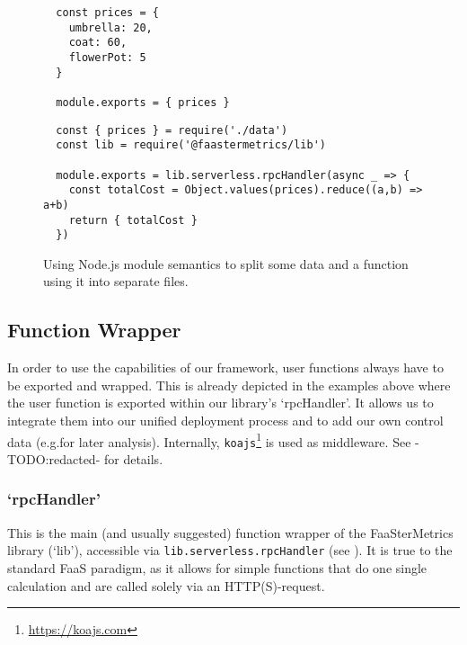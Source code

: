 \documentclass[../main.tex]{subfiles}
\begin{document}
\begin{figure}
\begin{tcolorbox}[left=3mm, right=3mm, top=3mm]
  \begin{tcolorbox}[enhanced, title={\texttt{[\ldots]/exampleFunction/data.js}}, attach boxed title to bottom left, boxed title style={sharp corners}]
  \begin{verbatim}
  const prices = {
    umbrella: 20,
    coat: 60,
    flowerPot: 5
  }

  module.exports = { prices }
  \end{verbatim}
  \end{tcolorbox}

  \begin{tcolorbox}[enhanced, title=\texttt{{[\ldots]/exampleFunction/index.js}}, attach boxed title to bottom left, boxed title style={sharp corners}]
  \begin{verbatim}
  const { prices } = require('./data')
  const lib = require('@faastermetrics/lib')

  module.exports = lib.serverless.rpcHandler(async _ => {
    const totalCost = Object.values(prices).reduce((a,b) => a+b)
    return { totalCost }
  })
  \end{verbatim}
  \end{tcolorbox}

\end{tcolorbox}
\caption{Using Node.js module semantics to split some data and a function using it into separate files.}%
\label{fig:dividingDataAndFunctionCodeNodeJS}
\end{figure}

\subsection{Function Wrapper}\label{sub:jsFunctionWrapper}

In order to use the capabilities of our framework, user functions always have to be exported and wrapped.
This is already depicted in the examples above where the user function is exported within our library's `rpcHandler'.
It allows us to integrate them into our unified deployment process and to add our own control data (e.g.\@ for later analysis).
Internally, \texttt{koajs}\footnote{\url{https://koajs.com}} is used as middleware. See -TODO:\@ redacted- for details.

\subsubsection{`rpcHandler'}%
\label{ssub:rpcHandler}
This is the main (and usually suggested) function wrapper of the FaaSterMetrics library (`lib'), 
accessible via \texttt{lib.serverless.rpcHandler} (see ).
It is true to the standard FaaS paradigm, as it allows for simple functions 
that do one single calculation and are called solely via an HTTP(S)-request.
\end{document}
